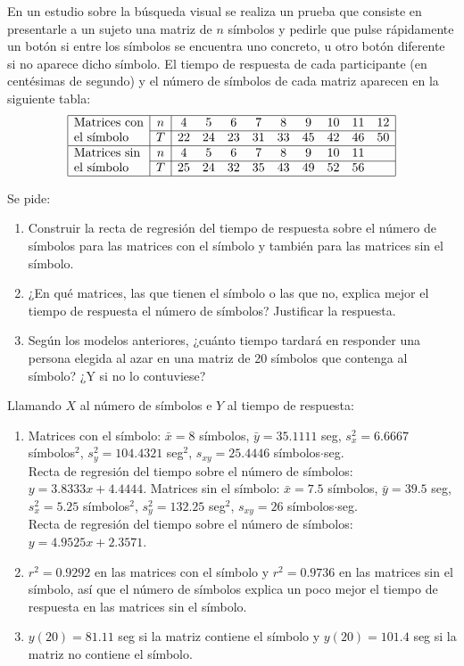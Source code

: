 {En un estudio sobre la búsqueda visual se realiza un prueba que consiste en presentarle a un sujeto una matriz de $n$
símbolos y pedirle que pulse rápidamente un botón si entre los símbolos se encuentra uno concreto, u otro botón
diferente si no aparece dicho símbolo.
El tiempo de respuesta de cada participante (en centésimas de segundo) y el número de símbolos de cada matriz aparecen
en la siguiente tabla:
\[
\begin{array}{|l|c|ccccccccc|}
\hline
\mbox{Matrices con} & n & 4 & 5 & 6 & 7 & 8 & 9 & 10 & 11 & 12\\
\cline{2-11}
\mbox{el símbolo} & T & 22 & 24 & 23 & 31 & 33 & 45 & 42 & 46 & 50\\
\hline
\mbox{Matrices sin} & n & 4 & 5 & 6 & 7 & 8 & 9 & 10 & 11 & \\
\cline{2-11}
\mbox{el símbolo} & T & 25 & 24 & 32 & 35 & 43 & 49 & 52 & 56 &\\
\hline
\end{array}
\]

Se pide:
\begin{enumerate}
\item Construir la recta de regresión del tiempo de respuesta sobre el número de símbolos para las matrices con el
símbolo y también para las matrices sin el símbolo.
\item ¿En qué matrices, las que tienen el símbolo o las que no, explica mejor el tiempo de respuesta el número de símbolos?
Justificar la respuesta.
\item Según los modelos anteriores, ¿cuánto tiempo tardará en responder una persona elegida al azar en una matriz de 20
símbolos que contenga al símbolo?
¿Y si no lo contuviese? 
\end{enumerate}
}
{Llamando $X$ al número de símbolos e $Y$ al tiempo de respuesta:
\begin{enumerate}
\item Matrices con el símbolo: $\bar x=8$ símbolos, $\bar y=35.1111$ seg, $s_x^2=6.6667$ símbolos$^2$, $s_y^2=104.4321$
seg$^2$, $s_{xy}=25.4446$ símbolos$\cdot$seg.\\
Recta de regresión del tiempo sobre el número de símbolos: $y=3.8333x+4.4444$.
Matrices sin el símbolo: $\bar x=7.5$ símbolos, $\bar y=39.5$ seg, $s_x^2=5.25$ símbolos$^2$, $s_y^2=132.25$
seg$^2$, $s_{xy}=26$ símbolos$\cdot$seg.\\
Recta de regresión del tiempo sobre el número de símbolos: $y=4.9525x+2.3571$.
\item $r^2=0.9292$ en las matrices con el símbolo y $r^2=0.9736$ en las matrices sin el símbolo, así que el número de
símbolos explica un poco mejor el tiempo de respuesta en las matrices sin el símbolo.
\item $y(20)=81.11$ seg si la matriz contiene el símbolo y $y(20)=101.4$ seg si la matriz no contiene el símbolo.
\end{enumerate}
}
{}


